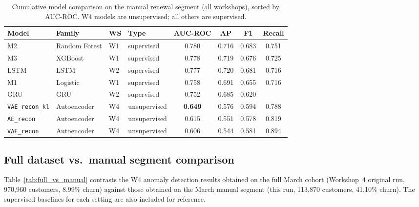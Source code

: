 \documentclass{article}
\begin{document}
\begin{table}[H]
    \centering
    \caption{Cumulative model comparison on the manual renewal segment (all workshops),
             sorted by AUC-ROC. W4 models are unsupervised; all others are supervised.}
    \label{tab:cumulative}
    \begin{tabular}{llllcccc}
        \toprule
        \textbf{Model} & \textbf{Family} & \textbf{WS} & \textbf{Type} &
        \textbf{AUC-ROC} & \textbf{AP} & \textbf{F1} & \textbf{Recall} \\
        \midrule
        M2            & Random Forest & W1 & supervised   & 0.780 & 0.716 & 0.683 & 0.751 \\
        M3            & XGBoost       & W1 & supervised   & 0.778 & 0.719 & 0.676 & 0.725 \\
        LSTM          & LSTM          & W2 & supervised   & 0.777 & 0.720 & 0.681 & 0.716 \\
        M1            & Logistic      & W1 & supervised   & 0.758 & 0.691 & 0.655 & 0.716 \\
        GRU           & GRU           & W2 & supervised   & 0.752 & 0.685 & 0.620 & -- \\
        \midrule
        \texttt{VAE\_recon\_kl} & Autoencoder & W4 & unsupervised & \textbf{0.649} & 0.576 & 0.594 & 0.788 \\
        \texttt{AE\_recon}      & Autoencoder & W4 & unsupervised & 0.615 & 0.551 & 0.578 & 0.819 \\
        \texttt{VAE\_recon}     & Autoencoder & W4 & unsupervised & 0.606 & 0.544 & 0.581 & 0.894 \\
        \bottomrule
    \end{tabular}
\end{table}

\subsection{Full dataset vs.\ manual segment comparison}

Table~\ref{tab:full_vs_manual} contrasts the W4 anomaly detection results obtained
on the full March cohort (Workshop~4 original run, 970{,}960 customers, 8.99\% churn)
against those obtained on the March manual segment (this run, 113{,}870 customers,
41.10\% churn). The supervised baselines for each setting are also included for reference.
\end{document}

